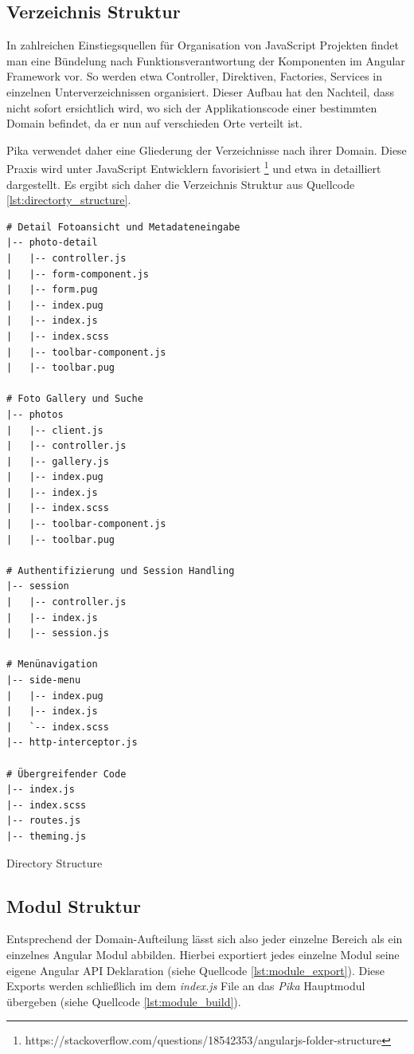 \subsection{Verzeichnis Struktur}

In zahlreichen Einstiegsquellen für Organisation von JavaScript Projekten findet man eine Bündelung nach Funktionsverantwortung der Komponenten im Angular Framework vor. So werden etwa Controller, Direktiven, Factories, Services in einzelnen Unterverzeichnissen organisiert. Dieser Aufbau hat den Nachteil, dass nicht sofort ersichtlich wird, wo sich der Applikationscode einer bestimmten Domain befindet, da er nun auf verschieden Orte verteilt ist.

Pika verwendet daher eine Gliederung der Verzeichnisse nach ihrer Domain. Diese Praxis wird unter JavaScript Entwicklern favorisiert \footnote{https://stackoverflow.com/questions/18542353/angularjs-folder-structure} und etwa in \cite{Kukic:2014} detailliert dargestellt. Es ergibt sich daher die Verzeichnis Struktur aus Quellcode \ref{lst:directorty_structure}.


\begin{listing}[H]
\begin{verbatim}
# Detail Fotoansicht und Metadateneingabe
|-- photo-detail
|   |-- controller.js
|   |-- form-component.js
|   |-- form.pug
|   |-- index.pug
|   |-- index.js
|   |-- index.scss
|   |-- toolbar-component.js
|   |-- toolbar.pug

# Foto Gallery und Suche
|-- photos
|   |-- client.js
|   |-- controller.js
|   |-- gallery.js
|   |-- index.pug
|   |-- index.js
|   |-- index.scss
|   |-- toolbar-component.js
|   |-- toolbar.pug

# Authentifizierung und Session Handling
|-- session
|   |-- controller.js
|   |-- index.js
|   |-- session.js

# Menünavigation
|-- side-menu
|   |-- index.pug
|   |-- index.js
|   `-- index.scss
|-- http-interceptor.js

# Übergreifender Code
|-- index.js
|-- index.scss
|-- routes.js
|-- theming.js
\end{verbatim}
\caption{Directory Structure}
\label{lst:directorty_structure}
\end{listing}

\subsection{Modul Struktur}

Entsprechend der Domain-Aufteilung lässt sich also jeder einzelne Bereich als ein einzelnes Angular Modul abbilden. Hierbei exportiert jedes einzelne Modul seine eigene Angular API Deklaration (siehe Quellcode \ref{lst:module_export}). Diese Exports werden schließlich im dem \emph{index.js} File an das \emph{Pika} Hauptmodul übergeben (siehe Quellcode \ref{lst:module_build}).


